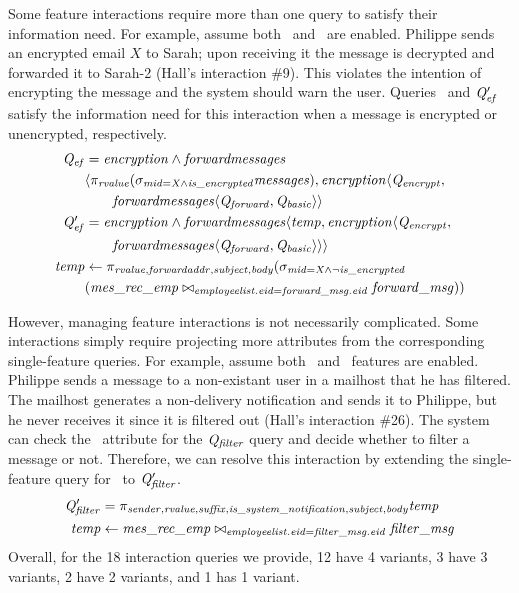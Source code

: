 %
Some feature interactions require more than one query to satisfy their
information need.
For example, assume both \encryption\ and \forwardmessages\ are enabled.
Philippe sends an encrypted email $X$ to Sarah; upon receiving it the message
is decrypted and forwarded it to Sarah-2 (Hall's interaction \#9). This
violates the intention of encrypting the message and the system should warn the
user.
%
Queries \Qef\ and $\Qef'$ satisfy the information need for this interaction
when a message is encrypted or unencrypted, respectively.
%
\begin{align*}
\small
\Qef &= \encryption\wedge\forwardmessages \\
  &\langle
    \projectRel{\rvalue}{(\selectRel{\midCond\wedge\isencrypted}{\messages})},
    \encryption\langle\Qencrypt, \\
  &\qquad \chc[\forwardmessages]{\Qforward,\Qbasic} \rangle \\
\OB{\Qef'} &= \encryption\wedge\forwardmessages
  \langle \temp, \encryption \langle \Qencrypt, \\
  &\qquad \chc[\forwardmessages]{\Qforward,\Qbasic} \rangle \rangle \\
\temp &\leftarrow
  \pi_{\rvalue,\forwardaddr,\subject,\body} (\sigma_{\midCond \wedge \neg\isencrypted} \\
  & (\mretable \bowtie_{\employees.\eid = \forwardmsg.\eid} \forwardmsg))
\end{align*}

\noindent
%
However, managing feature interactions is not necessarily complicated. Some
interactions simply require projecting more attributes from the corresponding
single-feature queries. For example, assume both \filtermessages\ and
\mailhost\ features are enabled. Philippe sends a message to a non-existant
user in a mailhost that he has filtered. The mailhost generates a non-delivery
notification and sends it to Philippe, but he never receives it since it is filtered out
(Hall's interaction \#26). The system can check the \issystemnotification\
attribute for the $\Qfilter$ query and decide whether to filter a message or
not. Therefore, we can resolve this interaction by extending the single-feature
query for \filtermessages\ to $\Qfilter'$.
%
\begin{align*}
\small
\OB{\Qfilter'} &= 
\projectRel {\sender, \rvalue, \suffix, \issystemnotification, \subject, \body} \temp\\
\temp &\leftarrow 
{\joinRel \mretable
\filtermsg
{\employees . \eid = \filtermsg . \eid }
}
\end{align*}
\noindent
%
Overall, for the 18 interaction queries we provide, 12 have 4 variants, 3 have
3 variants, 2 have 2 variants, and 1 has 1 variant.

